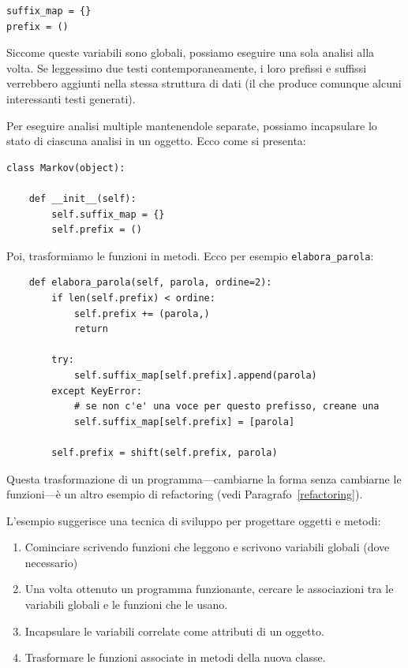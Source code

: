 \documentclass[10pt]{book}
\begin{document}
\begin{verbatim}
suffix_map = {}        
prefix = ()            
\end{verbatim}

Siccome queste variabili sono globali, possiamo eseguire una sola analisi alla volta. Se leggessimo due testi contemporaneamente, i loro prefissi e suffissi verrebbero aggiunti nella stessa struttura di dati (il che produce comunque alcuni interessanti testi generati).

Per eseguire analisi multiple mantenendole separate, possiamo incapsulare lo stato di ciascuna analisi in un oggetto. Ecco come si presenta:

\begin{verbatim}
class Markov(object):

    def __init__(self):
        self.suffix_map = {}
        self.prefix = ()    
\end{verbatim}

Poi, trasformiamo le funzioni in metodi. Ecco per esempio \verb"elabora_parola":

\begin{verbatim}
    def elabora_parola(self, parola, ordine=2):
        if len(self.prefix) < ordine:
            self.prefix += (parola,)
            return

        try:
            self.suffix_map[self.prefix].append(parola)
        except KeyError:
            # se non c'e' una voce per questo prefisso, creane una
            self.suffix_map[self.prefix] = [parola]

        self.prefix = shift(self.prefix, parola)        
\end{verbatim}

Questa trasformazione di un programma---cambiarne la forma senza cambiarne le funzioni---è un altro esempio di refactoring (vedi Paragrafo~\ref{refactoring}).

L'esempio suggerisce una tecnica di sviluppo per progettare oggetti e metodi:

\begin{enumerate}

\item Cominciare scrivendo funzioni che leggono e scrivono variabili globali (dove necessario)

\item Una volta ottenuto un programma funzionante, cercare le associazioni tra le variabili globali e le funzioni che le usano.

\item Incapsulare le variabili correlate come attributi di un oggetto.

\item Trasformare le funzioni associate in metodi della nuova classe.

\end{enumerate}
\end{document}
